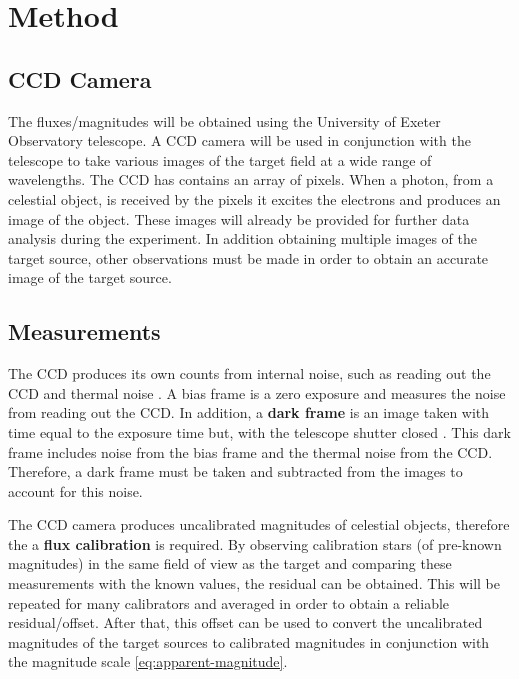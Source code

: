 \documentclass{article}
\begin{document}
\vspace{2mm}
\noindent
 
\section{Method}
\label{sec:method}

\subsection{CCD Camera}
\label{ssec:camera}

The fluxes/magnitudes will be obtained using the University of Exeter Observatory telescope. A CCD camera will be used in conjunction with the telescope to take various images of the target field at a wide range of wavelengths. The CCD has contains an array of pixels. When a photon, from a celestial object, is received by the pixels it excites the electrons and produces an image of the object. These images will already be provided for further data analysis during the experiment. In addition obtaining multiple images of the target source, other observations must be made in order to obtain an accurate image of the target source.

\subsection{Measurements}
\label{ssec:measurements}
The CCD produces its own counts from internal noise, such as reading out the CCD and thermal noise \cite{Paper01}. A bias frame is a zero exposure and measures the noise from reading out the CCD. In addition, a \textbf{dark frame} is an image taken with time equal to the exposure time but, with the telescope shutter closed \cite{Paper01}. This dark frame includes noise from the bias frame and the thermal noise from the CCD. Therefore, a dark frame must be taken and subtracted from the images to account for this noise.

\vspace{2mm}
\noindent
The CCD camera produces uncalibrated magnitudes of celestial objects, therefore the a \textbf{flux calibration} is required. By observing calibration stars (of pre-known magnitudes) in the same field of view as the target and comparing these measurements with the known values, the residual can be obtained. This will be repeated for many calibrators and averaged in order to obtain a reliable residual/offset. After that, this offset can be used to convert the uncalibrated magnitudes of the target sources to calibrated magnitudes in conjunction with the magnitude scale \eqref{eq:apparent-magnitude}.
\end{document}
